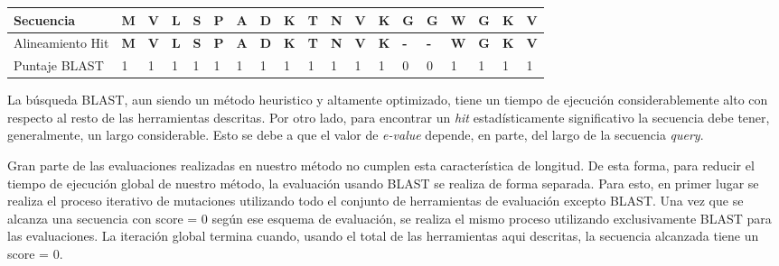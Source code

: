 \begin{adjustbox}{width=\textwidth}
\begin{tabular}{lllllllllllllllllll} 
\hline
Secuencia 		& \textbf{M} & \textbf{V} & \textbf{L} & \textbf{S} & \textbf{P} & \textbf{A} & \textbf{D} & \textbf{K} & \textbf{T} & \textbf{N} & \textbf{V} & \textbf{K} & \textbf{G} & \textbf{G} & \textbf{W} & \textbf{G} & \textbf{K} & \textbf{V}\\ \hline
Alineamiento Hit	& \textbf{M} & \textbf{V} & \textbf{L} & \textbf{S} & \textbf{P} & \textbf{A} & \textbf{D} & \textbf{K} & \textbf{T} & \textbf{N} & \textbf{V} & \textbf{K} & \textbf{-} & \textbf{-} & \textbf{W} & \textbf{G} & \textbf{K} & \textbf{V}\\ \hline
Puntaje BLAST 		& 1 & 1 & 1 & 1 & 1 & 1 & 1 & 1 & 1 & 1 & 1 & 1 & 0 & 0 & 1 & 1 & 1 & 1 \\ \hline
\end{tabular}
\end{adjustbox}
\vspace{0.5cm}

La búsqueda BLAST, aun siendo un método heuristico y altamente optimizado, tiene un tiempo de ejecución considerablemente alto con respecto al resto de las herramientas descritas.
Por otro lado, para encontrar un \textit{hit} estadísticamente significativo la secuencia debe tener, generalmente, un largo considerable.
Esto se debe a que el valor de \textit{e-value} depende, en parte, del largo de la secuencia \textit{query}. 

Gran parte de las evaluaciones realizadas en nuestro método no cumplen esta característica de longitud. 
De esta forma, para reducir el tiempo de ejecución global de nuestro método, la evaluación usando BLAST se realiza de forma separada. 
Para esto, en primer lugar se realiza el proceso iterativo de mutaciones utilizando todo el conjunto de herramientas de evaluación excepto BLAST.
Una vez que se alcanza una secuencia con score = 0 según ese esquema de evaluación, se realiza el mismo proceso utilizando exclusivamente BLAST para las evaluaciones.
La iteración global termina cuando, usando el total de las herramientas aqui descritas, la secuencia alcanzada tiene un score = 0. 














